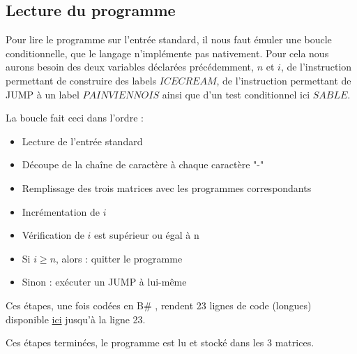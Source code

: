 \documentclass[11pt,colorlinks=true,a4paper]{article}
\newcommand{\bs}{B\# }
\begin{document}
    \subsection{Lecture du programme}
    Pour lire le programme sur l'entrée standard, il nous faut émuler une boucle conditionnelle, que le langage n'implémente pas nativement. 
    Pour cela nous aurons besoin des deux variables déclarées précédemment, $n$ et $i$, de l'instruction permettant de construire des labels $ICECREAM$,
    de l'instruction permettant de JUMP à un label $PAINVIENNOIS$ ainsi que d'un test conditionnel ici $SABLE$.\par 
    \bigskip 

    La boucle fait ceci dans l'ordre : 
    \begin{itemize}
        \item Lecture de l'entrée standard 
        \item Découpe de la chaîne de caractère à chaque caractère "-" 
        \item Remplissage des trois matrices avec les programmes correspondants
        \item Incrémentation de $i$
        \item Vérification de $i$ est supérieur ou égal à n
        \item Si $i\geq n$, alors : quitter le programme 
        \item Sinon : exécuter un JUMP à lui-même
    \end{itemize}

    Ces étapes, une fois codées en \bs , rendent 23 lignes de code (longues) disponible \href{https://github.com/coco33920/ocaml-baguettesharp-interpreter/blob/master/examples/turing.baguette#L3}{ici} 
    jusqu'à la ligne 23.\par 
    \bigskip 
    Ces étapes terminées, le programme est lu et stocké dans les 3 matrices.
\end{document}
